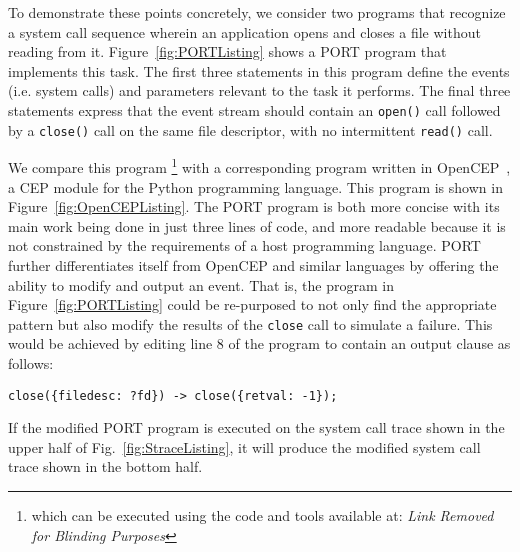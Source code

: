 To demonstrate these points concretely,
we consider two programs that recognize a system call sequence wherein an
application opens and closes a file
without reading from it.
Figure~\ref{fig:PORTListing} shows a PORT program that implements this
task.  The first three statements in this program define the events (i.e.
system calls) and parameters relevant to the task it performs.  The final three statements express that the event stream
should contain an \texttt{open()} call followed by a \texttt{close()} call on the same file descriptor, with no intermittent \texttt{read()} call.

We compare this program 
\footnote{which can be executed using the code and tools available at: \textit{Link Removed for Blinding Purposes}}
with a corresponding program written in OpenCEP~\cite{open_cep_website},
a CEP module for the Python programming language.
This program is shown in Figure~\ref{fig:OpenCEPListing}.
The PORT program is both more concise with its main work being done in just
three lines of code, and more readable because it is not constrained by the
requirements of a host programming language.
PORT further differentiates itself from OpenCEP and similar languages by
offering the ability to modify and output an event.
That is, the program in Figure~\ref{fig:PORTListing} could be
re-purposed to not only find the appropriate pattern but also modify the
results of the {\tt close} call to simulate a failure.
This would be achieved
by editing line 8 of the program to contain an output
clause as follows:
\begin{lstlisting}[numbers=none,xleftmargin=0em,gobble=2,columns=strict]
  close({filedesc: ?fd}) -> close({retval: -1});
\end{lstlisting}
If the modified PORT program is executed on the system call trace shown in the upper half of Fig.~\ref{fig:StraceListing}, it will produce the modified system call trace shown in the bottom half.







